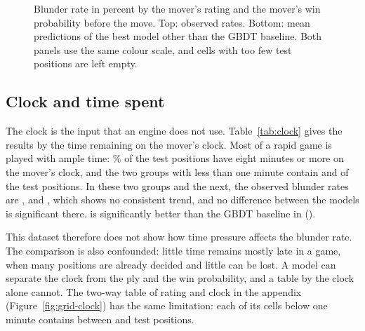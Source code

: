 \documentclass[11pt]{article}
\begin{document}
\begin{figure}[htbp]\centering
{}

\medskip
{}
\caption{Blunder rate in percent by the mover's rating and the mover's win
probability before the move. Top: observed rates. Bottom: mean predictions of
the best model other than the GBDT baseline. Both panels use the same colour
scale, and cells with too few test positions are left empty.}
\label{fig:grid-win}
\end{figure}

\subsection{Clock and time spent}

The clock is the input that an engine does not use. Table~\ref{tab:clock}
gives the results by the time remaining on the mover's clock. Most of a rapid
game is played with ample time: \% of the test
positions have eight minutes or more on the mover's clock, and the two groups
with less than one minute contain  and
 of the  test positions. In these
two groups and the next, the observed blunder rates are
,  and
, which shows no consistent trend, and no
difference between the models is significant there.  is
significantly better than the GBDT baseline in 
().

\begin{table}[htbp]\centering\footnotesize
{}
\caption{Test-set results by the time remaining on the mover's clock, in
seconds.}
\label{tab:clock}
\end{table}

This dataset therefore does not show how time pressure affects the blunder
rate. The comparison is also confounded: little time remains mostly late in a
game, when many positions are already decided and little can be lost. A
model can separate the clock from the ply and the win probability, and a
table by the clock alone cannot. The two-way table of rating and clock in the
appendix (Figure~\ref{fig:grid-clock}) has the same limitation: each of its
cells below one minute contains between 
and  test positions.
\end{document}
